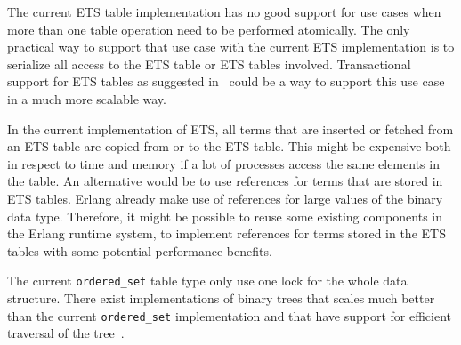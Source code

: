 \documentclass[aps,pre,preprint,nofootinbib]{revtex4}
\begin{document}
  The current ETS table implementation has no good support for use cases when more than one table operation need to be performed atomically.
  The only practical way to support that use case with the current ETS implementation is to serialize all access to the ETS table or ETS tables involved.
  Transactional support for ETS tables as suggested in~\cite{PatrikErlangTrans} could be a way to support this use case in a much more scalable way.
  
  In the current implementation of ETS, all terms that are inserted or fetched from an ETS table are copied from or to the ETS table.
  This might be expensive both in respect to time and memory if a lot of processes access the same elements in the table.
  An alternative would be to use references for terms that are stored in ETS tables. 
  Erlang already make use of references for large values of the binary data type.
  Therefore, it might be possible to reuse some existing components in the Erlang runtime system, to implement references for terms stored in the ETS tables with some potential performance benefits.
  
  The current \verb|ordered_set| table type only use one lock for the whole data structure.
  There exist implementations of binary trees that scales much better than the current \verb|ordered_set| implementation and that have support for efficient traversal of the tree~\cite{BronsonPracTree}.
  
  

  

  


  
\end{document}
